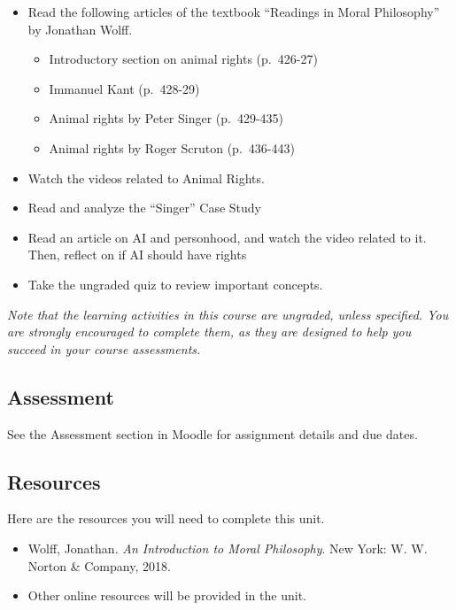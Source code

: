 \documentclass[
]{book}
\providecommand{\tightlist}{%
  \setlength{\itemsep}{0pt}\setlength{\parskip}{0pt}}
\begin{document}
\begin{itemize}
\tightlist
\item
  Read the following articles of the textbook ``Readings in Moral Philosophy'' by Jonathan Wolff.

  \begin{itemize}
  \tightlist
  \item
    Introductory section on animal rights (p.~426-27)
  \item
    Immanuel Kant (p.~428-29)
  \item
    Animal rights by Peter Singer (p.~429-435)
  \item
    Animal rights by Roger Scruton (p.~436-443)
  \end{itemize}
\item
  Watch the videos related to Animal Rights.
\item
  Read and analyze the ``Singer'' Case Study
\item
  Read an article on AI and personhood, and watch the video related to it. Then, reflect on if AI should have rights
\item
  Take the ungraded quiz to review important concepts.
\end{itemize}

\emph{Note that the learning activities in this course are ungraded, unless specified. You are strongly encouraged to complete them, as they are designed to help you succeed in your course assessments.}

\hypertarget{assessment-8}{%
\subsection*{Assessment}\label{assessment-8}}

See the Assessment section in Moodle for assignment details and due dates.

\hypertarget{resources-4}{%
\subsection*{Resources}\label{resources-4}}

Here are the resources you will need to complete this unit.

\begin{itemize}
\tightlist
\item
  Wolff, Jonathan. \emph{An Introduction to Moral Philosophy}. New York: W. W. Norton \& Company, 2018.
\item
  Other online resources will be provided in the unit.
\end{itemize}
\end{document}
